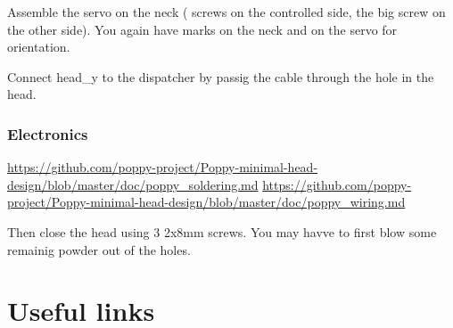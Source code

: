 \documentclass{article}
\begin{document}
Assemble the servo on the neck ( screws on the controlled side, the big screw on the other side). You again have marks on the neck and on the servo for orientation.

Connect head\_y to the dispatcher by passig the cable through the hole in the head.

\subsubsection{Electronics}

\url{https://github.com/poppy-project/Poppy-minimal-head-design/blob/master/doc/poppy_soldering.md}
\url{https://github.com/poppy-project/Poppy-minimal-head-design/blob/master/doc/poppy_wiring.md}

 

Then close the head using 3 \diameter 2x8mm screws. You may havve to first blow some remainig powder out of the holes.
 

 




 
\section{Useful links}
\label{documentation-links}
\end{document}
